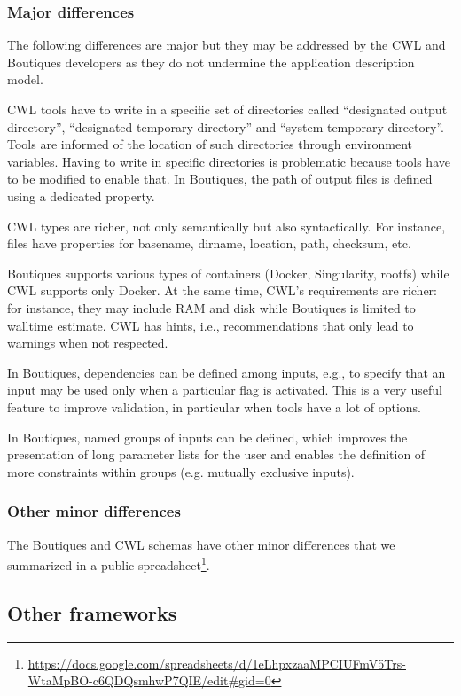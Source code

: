 \documentclass{article}
\newcommand{\boutiques}{Boutiques\xspace}
\begin{document}
\subsubsection{Major differences}

The following differences are major but they may be addressed by the
CWL and \boutiques developers as they do not undermine the application
description model.

CWL tools have to write in a specific set of directories called
``designated output directory'', ``designated temporary directory''
and ``system temporary directory''. Tools are informed of the location
of such directories through environment variables. Having to write in
specific directories is problematic because tools have to be modified
to enable that. In \boutiques, the path of output files is defined
using a dedicated property.

CWL types are richer, not only
semantically but also syntactically. For instance, files have
properties for basename, dirname, location, path, checksum, etc.

\boutiques supports various types of containers (Docker, Singularity,
rootfs) while CWL supports only Docker. At the same time, CWL’s
requirements are richer: for instance, they may include RAM and disk
while Boutiques is limited to walltime estimate. CWL has hints, i.e.,
recommendations that only lead to warnings when not respected.

In \boutiques, dependencies can be defined among inputs, e.g., to
specify that an input may be used only when a particular flag is
activated. This is a very useful feature to improve validation, in
particular when tools have a lot of options.

In \boutiques, named
groups of inputs can be defined, which improves the presentation of
long parameter lists for the user and enables the definition of more
constraints within groups (e.g. mutually exclusive inputs).

\subsubsection{Other minor differences}

The \boutiques and CWL schemas have other minor differences that we
summarized in a public
spreadsheet\footnote{\url{https://docs.google.com/spreadsheets/d/1eLhpxzaaMPCIUFmV5Trs-WtaMpBO-c6QDQsmhwP7QIE/edit\#gid=0}}.

\subsection{Other frameworks}
\end{document}

